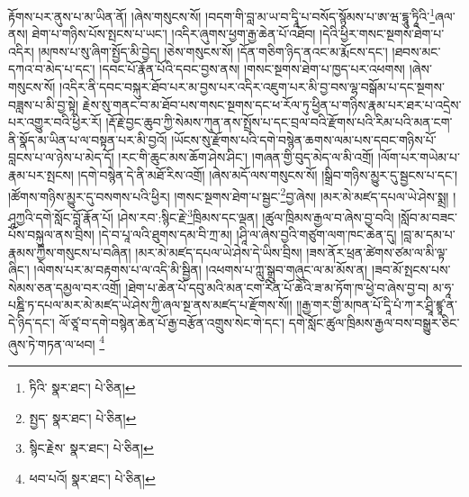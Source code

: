 རྟོགས་པར་ནུས་པ་མ་ཡིན་ནོ། །ཞེས་གསུངས་སོ། །བདག་གི་བླ་མ་ཡ་བ་དྭཱི་པ་བསོད་སྙོམས་པ་ཨ་ཝ་དྷཱུ་ཏཱིའི་\footnote{ཏིའི་  སྣར་ཐང་།  པེ་ཅིན། }ཞལ་ནས། ཐེག་པ་གཉིས་པོས་སྤངས་པ་ཡང་། །འདིར་ཞུགས་ཕྱག་རྒྱ་ཆེན་པོ་འཐོབ། །དེའི་ཕྱིར་གསང་སྔགས་ཐེག་པ་འདིར། །མཁས་པ་སུ་ཞིག་སྤྱོད་མི་བྱེད། །ཅེས་གསུངས་སོ། །དོན་གཅིག་ཉིད་ནའང་མ་རྨོངས་དང་། །ཐབས་མང་དཀའ་བ་མེད་པ་དང་། །དབང་པོ་རྣོན་པོའི་དབང་བྱས་ནས། །གསང་སྔགས་ཐེག་པ་ཁྱད་པར་འཕགས། །ཞེས་གསུངས་སོ། །འདིར་ནི་དབང་བསྐུར་ཐོབ་པར་མ་བྱས་པར་འདིར་འཇུག་པར་མི་བྱ་བས་ལྷ་བསྒོམ་པ་དང་སྔགས་བཟླས་པ་མི་བྱ་སྟེ། རྗེས་སུ་གནང་བ་མ་ཐོབ་པས་གསང་སྔགས་དང་ཕ་རོལ་ཏུ་ཕྱིན་པ་གཉིས་རྣམ་པར་ཐར་པ་འདྲེས་པར་འགྱུར་བའི་ཕྱིར་རོ། །རྡོ་རྗེ་བྱང་ཆུབ་ཀྱི་སེམས་ཀུན་ནས་སྤྲོས་པ་དང་བྲལ་བའི་རྫོགས་པའི་རིམ་པའི་མན་ངག་ནི་སྣོད་མ་ཡིན་པ་ལ་བསྟན་པར་མི་བྱའོ། །ཡོངས་སུ་རྫོགས་པའི་དགེ་བསྙེན་ཆགས་ལམ་པས་དབང་གཉིས་པོ་བླངས་པ་ལ་ཉེས་པ་མེད་དོ། །རང་གི་ཆུང་མས་ཆོག་ཤེས་ཤིང་། །གཞན་གྱི་བུད་མེད་ལ་མི་འགྲོ། །ལོག་པར་གཡེམ་པ་རྣམ་པར་སྤངས། །དགེ་བསྙེན་དེ་ནི་མཐོ་རིས་འགྲོ། །ཞེས་མདོ་ལས་གསུངས་སོ། །སྒྲིབ་གཉིས་མྱུར་དུ་སྦྱངས་པ་དང་། །ཚོགས་གཉིས་མྱུར་དུ་བསགས་པའི་ཕྱིར། །གསང་སྔགས་ཐེག་པ་སྦྱང་\footnote{སྤྱད་  སྣར་ཐང་།  པེ་ཅིན། }བྱ་ཞེས། །མར་མེ་མཛད་དཔལ་ཡེ་ཤེས་སྨྲ། །ཤཱཀྱའི་དགེ་སློང་བློ་རྣོན་པོ། །ཤེས་རབ་:སྙིང་རྗེ་\footnote{སྙིང་རྗེས་  སྣར་ཐང་།  པེ་ཅིན། }ཁྲིམས་དང་ལྡན། །ཚུལ་ཁྲིམས་རྒྱལ་བ་ཞེས་བྱ་བའི། །སློབ་མ་བཟང་པོས་བསྐུལ་ནས་བྲིས། །དེ་བ་པཱ་ལའི་ཐུགས་དམ་བི་ཀྲ་མ། །ཤཱི་ལ་ཞེས་བྱའི་གཙུག་ལག་ཁང་ཆེན་དུ། །བླ་མ་དམ་པ་རྣམས་ཀྱིས་གསུངས་པ་བཞིན། །མར་མེ་མཛད་དཔལ་ཡེ་ཤེས་དེ་ཡིས་བྲིས། །ཟས་ནོར་ཕྲན་ཚེགས་ཙམ་ལ་མི་ལྟ་ཞིང་། །ལེགས་པར་མ་བརྟགས་པ་ལ་འདི་མི་སྦྱིན། །འཕགས་པ་ཀླུ་སྒྲུབ་གཞུང་ལ་མ་མོས་ན། །ཟབ་མོ་སྤངས་པས་སེམས་ཅན་དམྱལ་བར་འགྲོ། །ཐེག་པ་ཆེན་པོ་དབུ་མའི་མན་ངག་རིན་པོ་ཆེའི་ཟ་མ་ཏོག་ཁ་ཕྱེ་བ་ཞེས་བྱ་བ། མ་ཧཱ་པཎྜི་ཏ་དཔལ་མར་མེ་མཛད་ཡེ་ཤེས་ཀྱི་ཞལ་སྔ་ནས་མཛད་པ་རྫོགས་སོ།། །།རྒྱ་གར་གྱི་མཁན་པོ་དཱི་པཾ་ཀ་ར་ཤྲཱི་ཛྙཱ་ན་དེ་ཉིད་དང་། ལོ་ཙཱ་བ་དགེ་བསྙེན་ཆེན་པོ་རྒྱ་བརྩོན་འགྲུས་སེང་གེ་དང་། དགེ་སློང་ཚུལ་ཁྲིམས་རྒྱལ་བས་བསྒྱུར་ཅིང་ཞུས་ཏེ་གཏན་ལ་ཕབ། \footnote{ཕབ་པའོ།   སྣར་ཐང་།  པེ་ཅིན། }